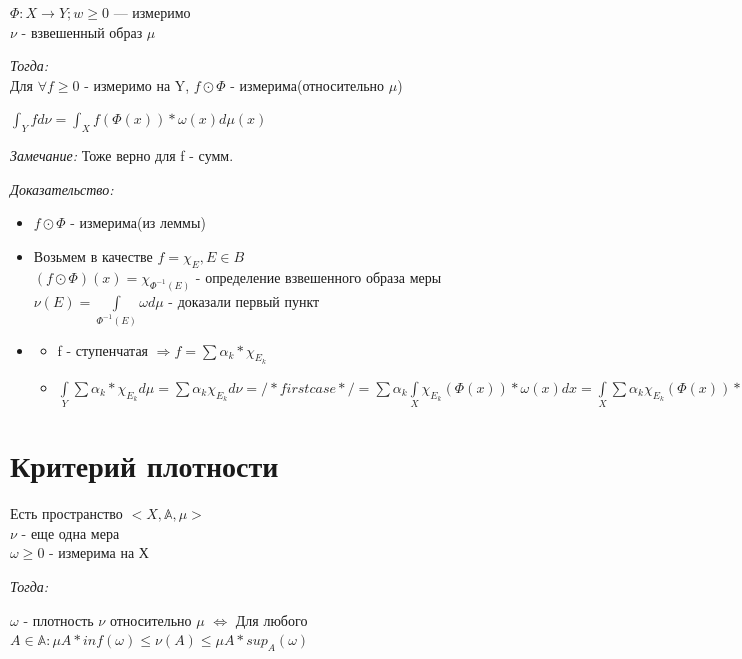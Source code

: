 \documentclass[paper=a4, fontsize=17pt]{article}
\begin{document}
		$\Phi: X\rightarrow Y; w \geq 0$ --- измеримо\\ $\nu$ - взвешенный образ $\mu$

		\emph{Тогда:}\\
		 Для $\forall f \geq 0$ - измеримо на Y, $f\odot \Phi$ - измерима(относительно $\mu$)

		$\int_{Y}f d\nu = \int_{X} f(\Phi(x)) * \omega(x) d\mu(x)$

		\emph{Замечание:} Тоже верно для f - сумм.

		\emph{Доказательство:} \\

			\begin{itemize}
				\item $f\odot \Phi$ - измерима(из леммы)
				\item Возьмем в качестве $f = \chi_{E} , E\in B$ \\
				$(f\odot \Phi)(x) = \chi_{\Phi^{-1}(E)}$ - определение взвешенного образа меры \\
				$\nu(E) = \int\limits_{\Phi^{-1}(E)}\omega d\mu$ - доказали первый пункт
				\item
				\begin{itemize}
					\item f - ступенчатая $\Rightarrow f = \sum \alpha_k * \chi_{E_k}$
					\item $\int\limits_{Y} \sum \alpha_k * \chi_{E_k} d\mu = \sum \alpha_k \chi_{E_k} d\nu = /* first case */ = \sum \alpha_k \int\limits_X \chi_{E_k}(\Phi(x))*\omega(x)dx = \int\limits_X \sum \alpha_k \chi_{E_k}(\Phi(x)) * \omega(x) d\mu(x) = \int f \odot \Phi * \omega d\mu$
				\end{itemize}
			\end{itemize}
\section{Критерий плотности}
	Есть пространство $<X, \mathbb{A}, \mu>$ \\
	$\nu$ - еще одна мера \\
	$\omega \geq 0$ - измерима на Х

	\emph{Тогда:}

	$\omega$ - плотность $\nu$ относительно $\mu$ $\Longleftrightarrow$ Для любого $A\in\mathbb{A}:\mu A * inf(\omega) \leq \nu(A) \leq \mu A * sup_A(\omega)$
\end{document}
